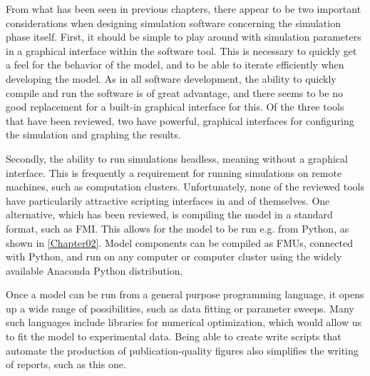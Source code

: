 \documentclass[\rootfolder/main.tex]{subfiles}
\begin{document}
From what has been seen in previous chapters, there appear to be two important considerations when designing simulation software concerning the simulation phase itself.
First, it should be simple to play around with simulation parameters in a graphical interface within the software tool.
This is necessary to quickly get a feel for the behavior of the model, and to be able to iterate efficiently when developing the model.
As in all software development, the ability to quickly compile and run the software is of great advantage, and there seems to be no good replacement for a built-in graphical interface for this.
Of the three tools that have been reviewed, two have powerful, graphical interfaces for configuring the simulation and graphing the results.

Secondly, the ability to run simulations headless, meaning without a graphical interface.
This is frequently a requirement for running simulations on remote machines, such as computation clusters.
Unfortunately, none of the reviewed tools have particularily attractive scripting interfaces in and of themselves.
One alternative, which has been reviewed, is compiling the model in a standard format, such as FMI.
This allows for the model to be run e.g. from Python, as shown in \cref{Chapter02}.
Model components can be compiled as FMUs, connected with Python, and run on any computer or computer cluster using the widely available Anaconda Python distribution.

Once a model can be run from a general purpose programming language, it opens up a wide range of possibilities, such as data fitting or parameter sweeps.
Many such languages include libraries for numerical optimization, which would allow us to fit the model to experimental data.
Being able to create write scripts that automate the production of publication-quality figures also simplifies the writing of reports, such as this one.
\end{document}
